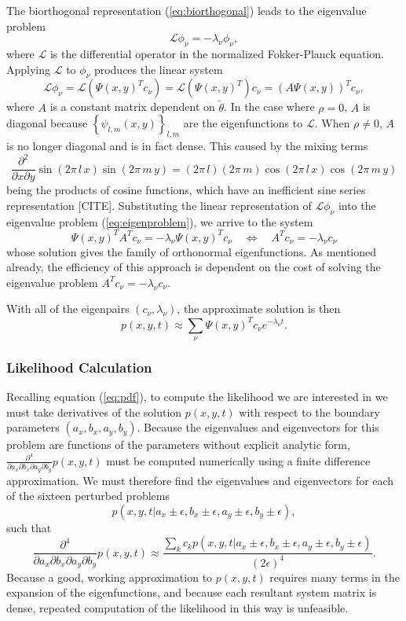 \documentclass[10pt]{article}
\begin{document}
The biorthogonal representation (\ref{eq:biorthogonal}) leads to the
eigenvalue problem
\begin{equation}
  \mathcal{L} \phi_\nu = -\lambda_\nu \phi_\nu, \label{eq:eigenproblem}
\end{equation}
where $\mathcal{L}$ is the differential operator in the normalized
Fokker-Planck equation. Applying $\mathcal{L}$ to $\phi_\nu$ produces
the linear system
\[
  \mathcal{L}\phi_\nu = \mathcal{L}(\Psi(x,y)^T c_\nu) =
  \mathcal{L}(\Psi(x,y)^T) c_\nu = (A \Psi(x,y))^T c_\nu,
\] 
where $A$ is a constant matrix dependent on $\tilde{\theta}$. In the
case where $\rho = 0$, $A$ is diagonal because
$\left\{ \psi_{l,m}(x,y) \right\}_{l,m}$ are the eigenfunctions to
$\mathcal{L}$. When $\rho \neq 0$, $A$ is no longer diagonal and is in
fact dense. This caused by the mixing terms
\[
  \frac{\partial^2}{\partial x \partial y} \sin\left(2\pi\, l\,
    x\right) \sin\left(2\pi\, m\, y\right) = (2\pi\, l)(2\pi\, m)
  \cos\left(2\pi\, l\, x\right) \cos\left(2\pi\, m\, y\right)
\]
being the products of cosine functions, which have an inefficient sine
series representation [CITE]. Substituting the linear representation
of $\mathcal{L}\phi_\nu$ into the eigenvalue problem
(\ref{eq:eigenproblem}), we arrive to the system
\[
  \Psi(x,y)^T A^T c_\nu = -\lambda_\nu \Psi(x,y)^T c_\nu
  \quad \Leftrightarrow \quad A^T c_\nu = -\lambda_\nu c_\nu
\]
whose solution gives the family of orthonormal eigenfunctions. As
mentioned already, the efficiency of this approach is dependent on the
cost of solving the eigenvalue problem
$A^T c_\nu = -\lambda_\nu c_\nu$.

With all of the eigenpairs $(c_\nu, \lambda_\nu)$, the approximate solution is then
\[
  p(x,y,t) \approx \sum_{\nu}\Psi(x,y)^T c_\nu e^{-\lambda_\nu t}.
\]

\subsubsection{Likelihood Calculation} \label{sec:likelihood-calc}
Recalling equation (\ref{eq:pdf}), to compute the likelihood we are
interested in we must take derivatives of the solution $p(x,y,t)$ with
respect to the boundary parameters $(a_x, b_x, a_y, b_y)$. Because the
eigenvalues and eigenvectors for this problem are functions of the
parameters without explicit analytic form,
$\frac{\partial^4}{\partial a_x\partial b_x \partial a_y \partial
  b_y}p(x,y,t)$ must be computed numerically using a finite difference
approximation. We must therefore find the eigenvalues and
eigenvectors for each of the sixteen perturbed problems
\[
  p(x,y,t | a_x \pm \epsilon, b_x \pm \epsilon, a_y \pm \epsilon, b_y \pm \epsilon),
\]
such that
\[
  \frac{\partial^4}{\partial a_x\partial b_x \partial a_y \partial
    b_y}p(x,y,t) \approx \frac{\sum_{k} c_k p(x,y,t | a_x \pm \epsilon, b_x \pm \epsilon, a_y \pm \epsilon, b_y \pm \epsilon)}{(2\epsilon)^4}.
\]
Because a good, working approximation to $p(x,y,t)$ requires many
terms in the expansion of the eigenfunctions, and because each
resultant system matrix is dense, repeated computation of the
likelihood in this way is unfeasible.
\end{document}
